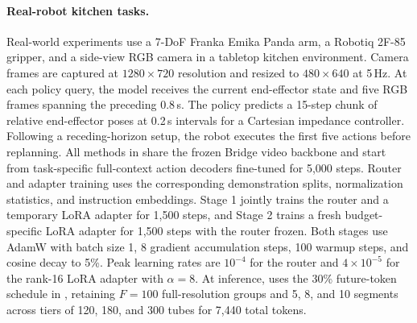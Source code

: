 \paragraph{Real-robot kitchen tasks.}
    Real-world experiments use a 7-DoF Franka Emika Panda arm, a Robotiq 2F-85 gripper, and a side-view RGB camera in a tabletop kitchen environment.
    Camera frames are captured at $1280\times 720$ resolution and resized to $480\times 640$ at 5\,Hz.
    At each policy query, the model receives the current end-effector state and five RGB frames spanning the preceding 0.8\,s.
    The policy predicts a 15-step chunk of relative end-effector poses at 0.2\,s intervals for a Cartesian impedance controller.
    Following a receding-horizon setup, the robot executes the first five actions before replanning.
    All methods in  share the frozen Bridge video backbone and start from task-specific full-context action decoders fine-tuned for 5,000 steps.
    Router and adapter training uses the corresponding demonstration splits, normalization statistics, and instruction embeddings.
    Stage 1 jointly trains the router and a temporary LoRA adapter for 1,500 steps, and Stage 2 trains a fresh budget-specific LoRA adapter for 1,500 steps with the router frozen.
    Both stages use AdamW with batch size 1, 8 gradient accumulation steps, 100 warmup steps, and cosine decay to 5\%.
    Peak learning rates are $10^{-4}$ for the router and $4\times 10^{-5}$ for the rank-16 LoRA adapter with $\alpha=8$.
    At inference, \method uses the 30\% future-token schedule in , retaining $F=100$ full-resolution groups and 5, 8, and 10 segments across tiers of 120, 180, and 300 tubes for 7,440 total tokens.
    
